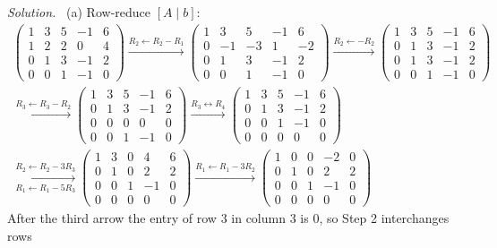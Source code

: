 \documentclass[12pt]{article}
\theoremstyle{definition}
\newenvironment{solution}{\par\noindent\textit{Solution.}\ }{\par\smallskip}
\begin{document}
\begin{solution}
(a) Row-reduce \([A\mid b]\):
\[
\begin{gathered}
\left(\begin{array}{cccc|c}1&3&5&-1&6\\1&2&2&0&4\\0&1&3&-1&2\\0&0&1&-1&0\end{array}\right)
\xrightarrow{R_2\leftarrow R_2-R_1}
\left(\begin{array}{cccc|c}1&3&5&-1&6\\0&-1&-3&1&-2\\0&1&3&-1&2\\0&0&1&-1&0\end{array}\right)
\xrightarrow{R_2\leftarrow-R_2}
\left(\begin{array}{cccc|c}1&3&5&-1&6\\0&1&3&-1&2\\0&1&3&-1&2\\0&0&1&-1&0\end{array}\right)
\\
\xrightarrow{R_3\leftarrow R_3-R_2}
\left(\begin{array}{cccc|c}1&3&5&-1&6\\0&1&3&-1&2\\0&0&0&0&0\\0&0&1&-1&0\end{array}\right)
\xrightarrow{R_3\leftrightarrow R_4}
\left(\begin{array}{cccc|c}1&3&5&-1&6\\0&1&3&-1&2\\0&0&1&-1&0\\0&0&0&0&0\end{array}\right)
\\
\xrightarrow[R_1\leftarrow R_1-5R_3]{R_2\leftarrow R_2-3R_3}
\left(\begin{array}{cccc|c}1&3&0&4&6\\0&1&0&2&2\\0&0&1&-1&0\\0&0&0&0&0\end{array}\right)
\xrightarrow{R_1\leftarrow R_1-3R_2}
\left(\begin{array}{cccc|c}1&0&0&-2&0\\0&1&0&2&2\\0&0&1&-1&0\\0&0&0&0&0\end{array}\right)
\end{gathered}
\]
After the third arrow the entry of row \(3\) in column \(3\) is \(0\), so Step 2 interchanges rows

\end{solution}
\end{document}
